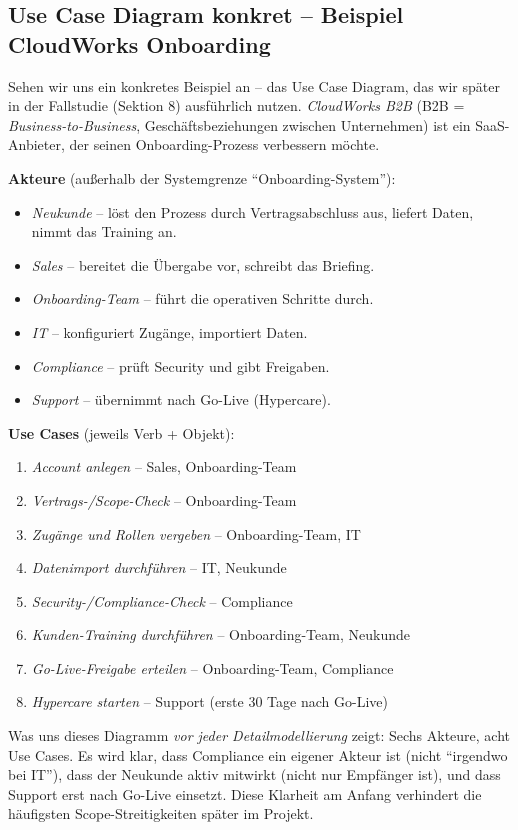 \documentclass[11pt,a4paper,oneside]{article}
\begin{document}
\subsection{Use Case Diagram konkret -- Beispiel CloudWorks Onboarding}

Sehen wir uns ein konkretes Beispiel an -- das Use Case Diagram, das wir später in der Fallstudie (Sektion 8) ausführlich nutzen. \emph{CloudWorks B2B} (B2B = \emph{Business-to-Business}, Geschäftsbeziehungen zwischen Unternehmen) ist ein SaaS-Anbieter, der seinen Onboarding-Prozess verbessern möchte.

\textbf{Akteure} (außerhalb der Systemgrenze ``Onboarding-System''):
\begin{itemize}
  \item \emph{Neukunde} -- löst den Prozess durch Vertragsabschluss aus, liefert Daten, nimmt das Training an.
  \item \emph{Sales} -- bereitet die Übergabe vor, schreibt das Briefing.
  \item \emph{Onboarding-Team} -- führt die operativen Schritte durch.
  \item \emph{IT} -- konfiguriert Zugänge, importiert Daten.
  \item \emph{Compliance} -- prüft Security und gibt Freigaben.
  \item \emph{Support} -- übernimmt nach Go-Live (Hypercare).
\end{itemize}

\textbf{Use Cases} (jeweils Verb + Objekt):
\begin{enumerate}
  \item \emph{Account anlegen} -- Sales, Onboarding-Team
  \item \emph{Vertrags-/Scope-Check} -- Onboarding-Team
  \item \emph{Zugänge und Rollen vergeben} -- Onboarding-Team, IT
  \item \emph{Datenimport durchführen} -- IT, Neukunde
  \item \emph{Security-/Compliance-Check} -- Compliance
  \item \emph{Kunden-Training durchführen} -- Onboarding-Team, Neukunde
  \item \emph{Go-Live-Freigabe erteilen} -- Onboarding-Team, Compliance
  \item \emph{Hypercare starten} -- Support (erste 30 Tage nach Go-Live)
\end{enumerate}

Was uns dieses Diagramm \emph{vor jeder Detailmodellierung} zeigt: Sechs Akteure, acht Use Cases. Es wird klar, dass Compliance ein eigener Akteur ist (nicht ``irgendwo bei IT''), dass der Neukunde aktiv mitwirkt (nicht nur Empfänger ist), und dass Support erst nach Go-Live einsetzt. Diese Klarheit am Anfang verhindert die häufigsten Scope-Streitigkeiten später im Projekt.
\end{document}
